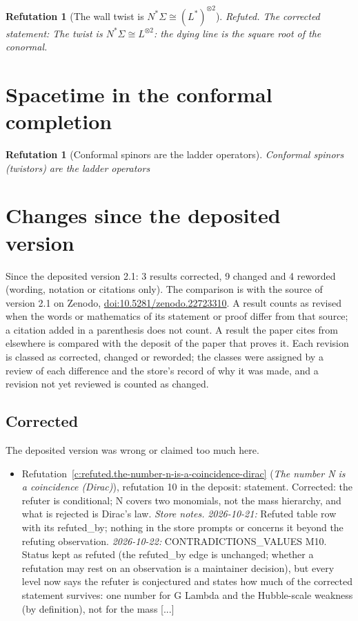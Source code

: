 \documentclass[11pt]{article}
\newtheorem{refutation}[theorem]{Refutation}
\theoremstyle{definition}
\theoremstyle{plain}
\newcommand{\changedmark}[2]{\marginpar{\raggedright\scriptsize\color{#1}#2}}
\begin{document}
\begin{refutation}[The wall twist is $N^{*}\Sigma \cong (L^{*})^{\otimes 2}$]\label{c:refuted.the-wall-twist-is}
\changedmark{gray}{reworded}
Refuted. The corrected statement: The twist is $N^{*}\Sigma \cong L^{\otimes 2}$: the dying line is the square root of the conormal.
\end{refutation}

\section{Spacetime in the conformal completion}

\begin{refutation}[Conformal spinors are the ladder operators]\label{c:refuted.twistors-are-the-ladder-operators}
\changedmark{gray}{reworded}
Conformal spinors (twistors) are the ladder operators
\end{refutation}

\section*{Changes since the deposited version}
Since the deposited version 2.1: 3 results corrected, 9 changed and 4 reworded (wording, notation or citations only). The comparison is with the source of version 2.1 on Zenodo, \href{https://doi.org/10.5281/zenodo.22723310}{doi:10.5281/zenodo.22723310}. A result counts as revised when the words or mathematics of its statement or proof differ from that source; a citation added in a parenthesis does not count. A result the paper cites from elsewhere is compared with the deposit of the paper that proves it. Each revision is classed as corrected, changed or reworded; the classes were assigned by a review of each difference and the store's record of why it was made, and a revision not yet reviewed is counted as changed.
\subsection*{Corrected}
The deposited version was wrong or claimed too much here.
\begin{itemize}\setlength{\itemsep}{2pt}
\item Refutation~\ref{c:refuted.the-number-n-is-a-coincidence-dirac} (\emph{The number N is a coincidence (Dirac)}), refutation 10 in the deposit: statement. Corrected: the refuter is conditional; N covers two monomials, not the mass hierarchy, and what is rejected is Dirac's law. \emph{Store notes.} \emph{2026-10-21:} Refuted table row with its refuted\_by; nothing in the store prompts or concerns it beyond the refuting observation. \emph{2026-10-22:} CONTRADICTIONS\_VALUES M10. Status kept as refuted (the refuted\_by edge is unchanged; whether a refutation may rest on an observation is a maintainer decision), but every level now says the refuter is conjectured and states how much of the corrected statement survives: one number for G Lambda and the Hubble-scale weakness (by definition), not for the mass [...]
\end{itemize}
\end{document}
